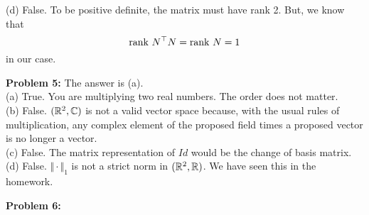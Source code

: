 \documentclass[letterpaper]{article}
\begin{document}
(d) False. To be positive definite, the matrix must have rank 2. But, we know that $${\rm rank}~N^\top N = {\rm rank} ~N =1$$
in our case.



\bigskip

\newpage

\noindent \textbf{Problem 5:} The answer is (a). \\

(a) True. You are multiplying two real numbers. The order does not matter. \\

(b) False. $(\mathbb R^2, \mathbb C) $ is not a valid vector space because, with the usual rules of multiplication, any complex element of the proposed field times a proposed vector is no longer a vector. \\

(c) False. The matrix representation of $Id$ would be the change of basis matrix.\\

(d) False. $\Vert \cdot \Vert_1$ is not a strict norm in $(\mathbb R^2, \mathbb R) $. We have seen this in the homework.



\newpage

\noindent \textbf{Problem 6:}
\end{document}
